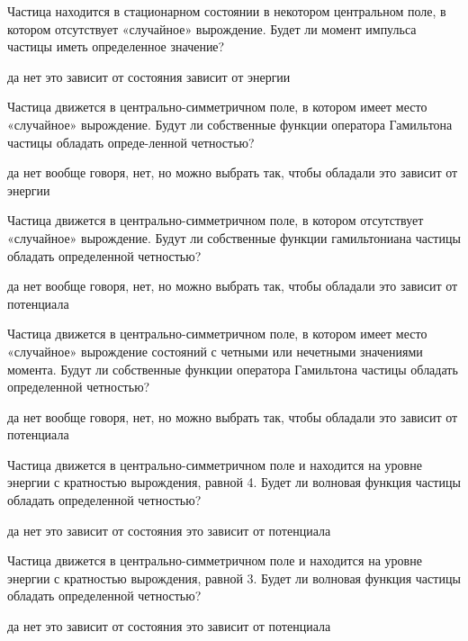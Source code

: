 \documentclass[11pt,a4paper]{exam}
\begin{document}
\begin{questions}
\question Частица находится в стационарном состоянии в некотором центральном поле, в котором отсутствует «случайное» вырождение. Будет ли момент импульса частицы иметь определенное значение? 
\begin{choices}
\choice да    
\choice нет      
\choice это зависит от состояния      
\choice зависит от энергии
\end{choices}

\question Частица движется в центрально-симметричном поле, в котором имеет место «случайное» вырождение. Будут ли собственные функции оператора Гамильтона частицы обладать опреде-ленной четностью?
\begin{choices}
\choice да
\choice нет
\choice вообще говоря, нет, но можно выбрать так, чтобы обладали
\choice это зависит от энергии
\end{choices}

\question Частица движется в центрально-симметричном поле, в котором отсутствует «случайное» вырождение. Будут ли собственные функции гамильтониана частицы обладать определенной четностью?
\begin{choices}
\choice да
\choice нет
\choice вообще говоря, нет, но можно выбрать так, чтобы обладали
\choice это зависит от потенциала
\end{choices}

\question Частица движется в центрально-симметричном поле, в котором имеет место «случайное» вырождение состояний с четными или нечетными значениями момента. Будут ли собственные функции оператора Гамильтона частицы обладать определенной четностью?
\begin{choices}
\choice да
\choice нет
\choice вообще говоря, нет, но можно выбрать так, чтобы обладали
\choice это зависит от потенциала
\end{choices}

\question Частица движется в центрально-симметричном поле и находится на уровне энергии с кратностью вырождения, равной 4. Будет ли волновая функция частицы обладать определенной четностью?
\begin{choices}
\choice да    
\choice нет      
\choice это зависит от состояния      
\choice это зависит от потенциала
\end{choices}

\question Частица движется в центрально-симметричном поле и находится на уровне энергии с кратностью вырождения, равной 3. Будет ли волновая функция частицы обладать определенной четностью?
\begin{choices}
\choice да    
\choice нет      
\choice это зависит от состояния      
\choice это зависит от потенциала
\end{choices}


\end{questions}
\end{document}
